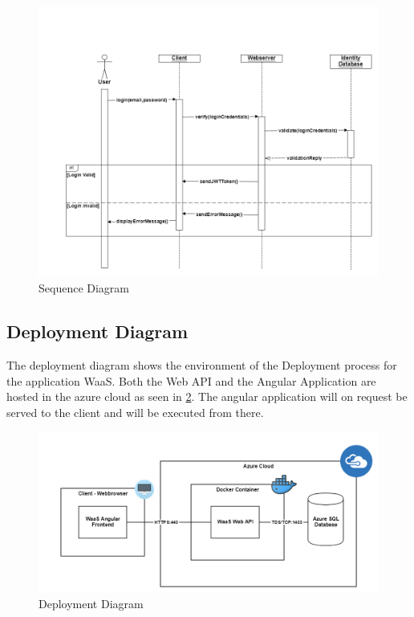 \documentclass[titlepage, 12pt]{article}
\begin{document}
\begin{figure}[H]
  \includegraphics[width=0.95\linewidth]{SequenceDiagram.png}
  \caption{Sequence Diagram}
  \label{fig:sequenceDiagram}
\end{figure}

\subsection{Deployment Diagram}
The deployment diagram shows the environment of the Deployment process for the application WaaS. Both the Web API and the Angular Application are hosted in the azure cloud as seen in \ref{fig:deploymentDiagram}. The angular application will on request be served to the client and will be executed from there.

\begin{figure}[H]
  \includegraphics[width=0.95\linewidth]{DeploymentDiagram.png}
  \caption{Deployment Diagram}
  \label{fig:deploymentDiagram}
\end{figure}
\end{document}

